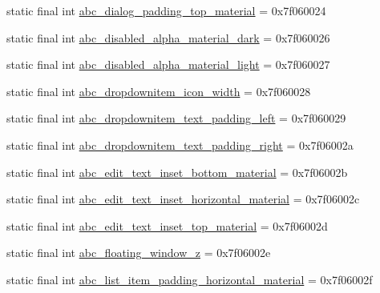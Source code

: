 \begin{DoxyCompactItemize}
\item 
static final int \mbox{\hyperlink{classcom_1_1google_1_1android_1_1gms_1_1R_1_1dimen_a47661ba1e7583c4d3b4da572ba56a521}{abc\+\_\+dialog\+\_\+padding\+\_\+top\+\_\+material}} = 0x7f060024
\item 
static final int \mbox{\hyperlink{classcom_1_1google_1_1android_1_1gms_1_1R_1_1dimen_abbab92507614760fe9f6f3e2c29902d4}{abc\+\_\+disabled\+\_\+alpha\+\_\+material\+\_\+dark}} = 0x7f060026
\item 
static final int \mbox{\hyperlink{classcom_1_1google_1_1android_1_1gms_1_1R_1_1dimen_a6f0875bb90e8e8893f119e95a91b0a02}{abc\+\_\+disabled\+\_\+alpha\+\_\+material\+\_\+light}} = 0x7f060027
\item 
static final int \mbox{\hyperlink{classcom_1_1google_1_1android_1_1gms_1_1R_1_1dimen_aa537fff81b9c7f1c15cb7e75427297ed}{abc\+\_\+dropdownitem\+\_\+icon\+\_\+width}} = 0x7f060028
\item 
static final int \mbox{\hyperlink{classcom_1_1google_1_1android_1_1gms_1_1R_1_1dimen_a7342c4da9e649ec9862bfc18d08ae340}{abc\+\_\+dropdownitem\+\_\+text\+\_\+padding\+\_\+left}} = 0x7f060029
\item 
static final int \mbox{\hyperlink{classcom_1_1google_1_1android_1_1gms_1_1R_1_1dimen_aed815039738d3585caa62922aad6aa7f}{abc\+\_\+dropdownitem\+\_\+text\+\_\+padding\+\_\+right}} = 0x7f06002a
\item 
static final int \mbox{\hyperlink{classcom_1_1google_1_1android_1_1gms_1_1R_1_1dimen_ac09599aa0378d3838549aa61d4509839}{abc\+\_\+edit\+\_\+text\+\_\+inset\+\_\+bottom\+\_\+material}} = 0x7f06002b
\item 
static final int \mbox{\hyperlink{classcom_1_1google_1_1android_1_1gms_1_1R_1_1dimen_a3e1d53b1554f58703308af79b02d3165}{abc\+\_\+edit\+\_\+text\+\_\+inset\+\_\+horizontal\+\_\+material}} = 0x7f06002c
\item 
static final int \mbox{\hyperlink{classcom_1_1google_1_1android_1_1gms_1_1R_1_1dimen_a9932679ee188fbffe6b306680d8f949f}{abc\+\_\+edit\+\_\+text\+\_\+inset\+\_\+top\+\_\+material}} = 0x7f06002d
\item 
static final int \mbox{\hyperlink{classcom_1_1google_1_1android_1_1gms_1_1R_1_1dimen_aa15603e5da137bac5bc6a46788c2d170}{abc\+\_\+floating\+\_\+window\+\_\+z}} = 0x7f06002e
\item 
static final int \mbox{\hyperlink{classcom_1_1google_1_1android_1_1gms_1_1R_1_1dimen_a95170d6dce48e817b76c457c7ba1618e}{abc\+\_\+list\+\_\+item\+\_\+padding\+\_\+horizontal\+\_\+material}} = 0x7f06002f

\end{DoxyCompactItemize}
